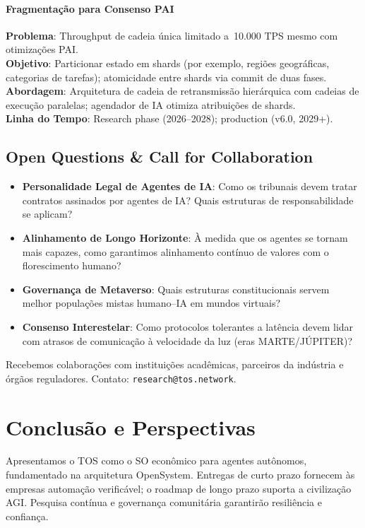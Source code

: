 \documentclass[11pt]{article}
\begin{document}
\begin{itemize}[noitemsep]
\begin{itemize}[noitemsep]
\begin{itemize}[noitemsep]
\paragraph{Fragmentação para Consenso PAI}
\textbf{Problema}: Throughput de cadeia única limitado a~10.000 TPS mesmo com otimizações PAI.\\
\textbf{Objetivo}: Particionar estado em shards (por exemplo, regiões geográficas, categorias de tarefas); atomicidade entre shards via commit de duas fases.\\
\textbf{Abordagem}: Arquitetura de cadeia de retransmissão hierárquica com cadeias de execução paralelas; agendador de IA otimiza atribuições de shards.\\
\textbf{Linha do Tempo}: Research phase (2026--2028); production (v6.0, 2029+).

\subsection{Open Questions \& Call for Collaboration}

\begin{itemize}[noitemsep]
  \item \textbf{Personalidade Legal de Agentes de IA}: Como os tribunais devem tratar contratos assinados por agentes de IA? Quais estruturas de responsabilidade se aplicam?
  \item \textbf{Alinhamento de Longo Horizonte}: À medida que os agentes se tornam mais capazes, como garantimos alinhamento contínuo de valores com o florescimento humano?
  \item \textbf{Governança de Metaverso}: Quais estruturas constitucionais servem melhor populações mistas humano--IA em mundos virtuais?
  \item \textbf{Consenso Interestelar}: Como protocolos tolerantes a latência devem lidar com atrasos de comunicação à velocidade da luz (eras MARTE/JÚPITER)?
\end{itemize}

Recebemos colaborações com instituições acadêmicas, parceiros da indústria e órgãos reguladores. Contato: \texttt{research@tos.network}.

\section{Conclusão e Perspectivas}
Apresentamos o TOS como o SO econômico para agentes autônomos, fundamentado na arquitetura OpenSystem. Entregas de curto prazo fornecem às empresas automação verificável; o roadmap de longo prazo suporta a civilização AGI. Pesquisa contínua e governança comunitária garantirão resiliência e confiança.


\end{itemize}
\end{itemize}
\end{itemize}
\end{document}
